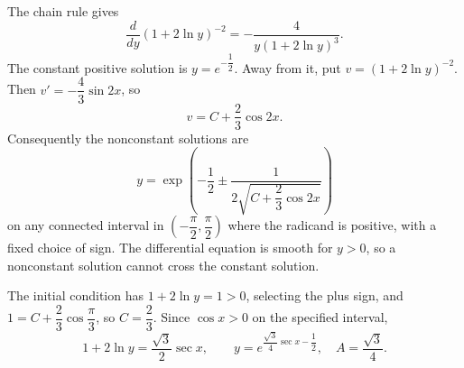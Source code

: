 The chain rule gives
\[
\boxed{\dfrac{d}{dy}(1+2\ln y)^{-2}=-\dfrac{4}{y(1+2\ln y)^3}}.
\]
The constant positive solution is $\boxed{y=e^{-\dfrac{1}{2}}}$. Away from it, put $v=(1+2\ln y)^{-2}$. Then $v'=-\dfrac{4}{3}\sin2x$, so
\[
v=C+\dfrac{2}{3}\cos2x.
\]
Consequently the nonconstant solutions are
\[
\boxed{y=\exp\left(-\dfrac{1}{2}\pm\dfrac{1}{2\sqrt{C+\dfrac{2}{3}\cos2x}}\right)}
\]
on any connected interval in $(-\dfrac{\pi}{2},\dfrac{\pi}{2})$ where the radicand is positive, with a fixed choice of sign. The differential equation is smooth for $y>0$, so a nonconstant solution cannot cross the constant solution.

The initial condition has $1+2\ln y=1>0$, selecting the plus sign, and $1=C+\dfrac{2}{3}\cos\dfrac{\pi}{3}$, so $C=\dfrac{2}{3}$. Since $\cos x>0$ on the specified interval,
\[
1+2\ln y=\dfrac{\sqrt3}{2}\sec x,\qquad
\boxed{y=e^{\dfrac{\sqrt3}{4}\sec x-\dfrac{1}{2}},\quad A=\dfrac{\sqrt3}{4}}.
\]
